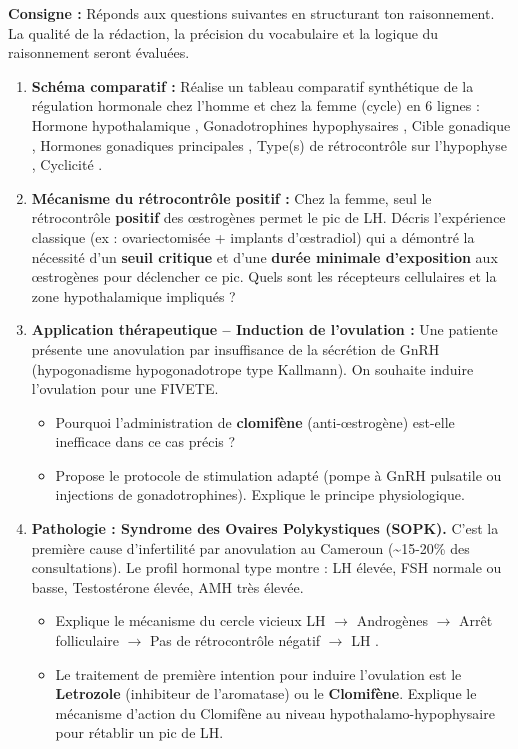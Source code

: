 \documentclass[11pt]{article}
\begin{document}
\begin{exercice}
\textbf{Consigne :} Réponds aux questions suivantes en structurant ton raisonnement. La qualité de la rédaction, la précision du vocabulaire et la logique du raisonnement seront évaluées.
\begin{enumerate}
    \item \textbf{Schéma comparatif :} Réalise un tableau comparatif synthétique de la régulation hormonale chez l'homme et chez la femme (cycle) en 6 lignes : \og Hormone hypothalamique \fg, \og Gonadotrophines hypophysaires \fg, \og Cible gonadique \fg, \og Hormones gonadiques principales \fg, \og Type(s) de rétrocontrôle sur l'hypophyse \fg, \og Cyclicité \fg.
    \item \textbf{Mécanisme du rétrocontrôle positif :} Chez la femme, seul le rétrocontrôle \textbf{positif} des œstrogènes permet le pic de LH. Décris l'expérience classique (ex : ovariectomisée + implants d'œstradiol) qui a démontré la nécessité d'un \textbf{seuil critique} et d'une \textbf{durée minimale d'exposition} aux œstrogènes pour déclencher ce pic. Quels sont les récepteurs cellulaires et la zone hypothalamique impliqués ?
    \item \textbf{Application thérapeutique -- Induction de l'ovulation :} Une patiente présente une anovulation par insuffisance de la sécrétion de GnRH (hypogonadisme hypogonadotrope type Kallmann). On souhaite induire l'ovulation pour une FIVETE.
    \begin{itemize}
        \item[a.] Pourquoi l'administration de \textbf{clomifène} (anti-œstrogène) est-elle inefficace dans ce cas précis ?
        \item[b.] Propose le protocole de stimulation adapté (pompe à GnRH pulsatile ou injections de gonadotrophines). Explique le principe physiologique.
    \end{itemize}
    \item \textbf{Pathologie : Syndrome des Ovaires Polykystiques (SOPK).} C'est la première cause d'infertilité par anovulation au Cameroun (\textasciitilde 15-20\% des consultations). Le profil hormonal type montre : LH élevée, FSH normale ou basse, Testostérone élevée, AMH très élevée.
    \begin{itemize}
        \item[a.] Explique le mécanisme du cercle vicieux \og LH $\rightarrow$ Androgènes $\rightarrow$ Arrêt folliculaire $\rightarrow$ Pas de rétrocontrôle négatif $\rightarrow$ LH \fg.
        \item[b.] Le traitement de première intention pour induire l'ovulation est le \textbf{Letrozole} (inhibiteur de l'aromatase) ou le \textbf{Clomifène}. Explique le mécanisme d'action du Clomifène au niveau hypothalamo-hypophysaire pour rétablir un pic de LH.
    \end{itemize}
\end{enumerate}
\end{exercice}
\end{document}
